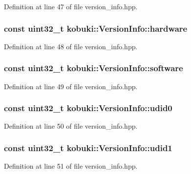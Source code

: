 \-Definition at line 47 of file version\-\_\-info.\-hpp.

\subsubsection[{hardware}]{\setlength{\rightskip}{0pt plus 5cm}const uint32\-\_\-t {\bf kobuki\-::\-Version\-Info\-::hardware}}\label{classkobuki_1_1VersionInfo_a4d2261074a65c62c12d1fc40d1368192}


\-Definition at line 48 of file version\-\_\-info.\-hpp.

\subsubsection[{software}]{\setlength{\rightskip}{0pt plus 5cm}const uint32\-\_\-t {\bf kobuki\-::\-Version\-Info\-::software}}\label{classkobuki_1_1VersionInfo_ab2cc9f17d6e44b990259b5b281b8f4e5}


\-Definition at line 49 of file version\-\_\-info.\-hpp.

\subsubsection[{udid0}]{\setlength{\rightskip}{0pt plus 5cm}const uint32\-\_\-t {\bf kobuki\-::\-Version\-Info\-::udid0}}\label{classkobuki_1_1VersionInfo_a8a870f7880ce0b1d96e34b03f8bc9e1a}


\-Definition at line 50 of file version\-\_\-info.\-hpp.

\subsubsection[{udid1}]{\setlength{\rightskip}{0pt plus 5cm}const uint32\-\_\-t {\bf kobuki\-::\-Version\-Info\-::udid1}}\label{classkobuki_1_1VersionInfo_a98b2b65f7f2ea13ca889f73706ac14dd}


\-Definition at line 51 of file version\-\_\-info.\-hpp.


